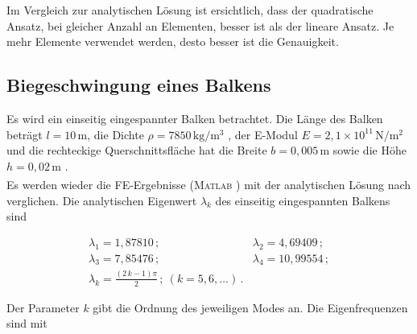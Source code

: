 \documentclass[a4paper,10pt,twoside]{article}
\numberwithin{equation}{section} %
\numberwithin{figure}{section}   %
\numberwithin{table}{section}    %
\newcommand{\Matlab}{\textsc{Matlab}\textsuperscript{\textregistered} }
\begin{document}
	Im Vergleich zur analytischen Lösung ist ersichtlich, dass der quadratische Ansatz, bei gleicher Anzahl an Elementen, besser ist als der lineare Ansatz. Je mehr Elemente verwendet werden, desto besser ist die Genauigkeit. 
	
	\subsection{Biegeschwingung eines Balkens} \label{sec:analysieren-balken}
	Es wird ein einseitig eingespannter Balken betrachtet. Die Länge des Balken beträgt $ l = 10 \, \text{m} $, die Dichte $ \rho=  7850 \, \text{kg}/\text{m}^{3} $ , der E-Modul $ E = 2,1\times10^{11} \, \text{N}/\text{m}^{2} $ und die rechteckige Querschnittsfläche hat die Breite $ b= 0,005 \, \text{m} $ sowie die Höhe $ h = 0,02 \, \text{m} $ . \\
	Es werden wieder die FE-Ergebnisse (\Matlab) mit der analytischen Lösung nach \cite{stephan1995schwingungen} verglichen. Die analytischen Eigenwert $ \lambda_{k} $ des einseitig eingespannten Balkens sind
	
	\begin{equation}\label{equ:analytisch-eigenwert-balken}
	\begin{array}{ll}
	\lambda_{1}=1,87810 \, ; & \lambda_{2}=4,69409 \, ; \\
	\lambda_{3}=7,85476 \, ; & \lambda_{4}=10,99554 \, ; \\
	\lambda_{k}=\frac{(2 \, k -1) \pi}{2} \, ; \ (k=5,6,\ldots) \,.
	\end{array}
	\end{equation}
	
	Der Parameter $ k $ gibt die Ordnung des jeweiligen Modes an. Die Eigenfrequenzen sind mit 
	
\end{document}
